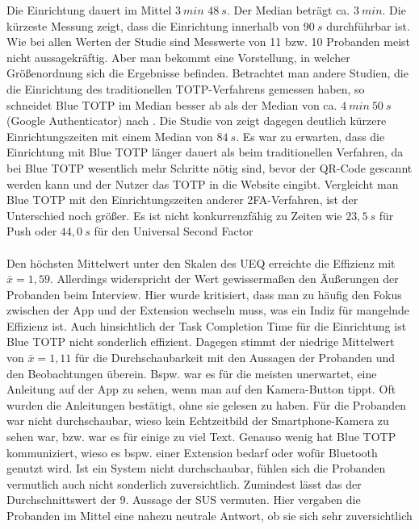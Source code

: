 Die Einrichtung dauert im Mittel $3~min$ $48~s$. Der Median 
beträgt ca. $3~min$. Die kürzeste Messung zeigt, dass die 
Einrichtung innerhalb von $90~s$ durchführbar ist. Wie bei allen 
Werten der Studie sind Messwerte von 11 bzw. 10 Probanden meist 
nicht aussagekräftig. Aber man bekommt eine Vorstellung, in 
welcher Größenordnung sich die Ergebnisse befinden. Betrachtet man 
andere Studien, die die Einrichtung des traditionellen 
TOTP-Verfahrens gemessen haben, so schneidet Blue TOTP im Median 
besser ab als der Median von ca. $4~min~50~s$ (Google 
Authenticator) nach \textcite{Acemyan}. Die Studie von 
\textcite{Reese} zeigt dagegen deutlich kürzere Einrichtungszeiten 
mit einem Median von $84~s$. Es war zu erwarten, dass die 
Einrichtung mit Blue TOTP länger dauert als beim traditionellen 
Verfahren, da bei Blue TOTP wesentlich mehr Schritte nötig sind, 
bevor der QR-Code gescannt werden kann und der Nutzer das TOTP in 
die Website eingibt. Vergleicht man Blue TOTP mit den Einrichtungszeiten anderer 
2FA-Verfahren, ist der Unterschied noch größer. Es ist nicht konkurrenzfähig 
zu Zeiten wie $23{,}5~s$ für Push oder $44{,}0~s$ für den Universal Second Factor \autocite{Reese}
\\\\
Den höchsten Mittelwert unter den Skalen des UEQ erreichte die 
Effizienz mit $\bar{x} = 1{,}59$. Allerdings widerspricht der Wert 
gewissermaßen den Äußerungen der Probanden beim Interview. Hier 
wurde kritisiert, dass man zu häufig den Fokus zwischen der App 
und der Extension wechseln muss, was ein Indiz für mangelnde 
Effizienz ist. Auch hinsichtlich der Task Completion Time für die 
Einrichtung ist Blue TOTP nicht sonderlich effizient. Dagegen 
stimmt der niedrige Mittelwert von $\bar{x} = 1{,}11$ für die 
Durchschaubarkeit mit den Aussagen der Probanden und den 
Beobachtungen überein. Bspw. war es für die meisten unerwartet, 
eine Anleitung auf der App zu sehen, wenn man auf den 
Kamera-Button tippt. Oft wurden die Anleitungen bestätigt, ohne 
sie gelesen zu haben. Für die Probanden war nicht durchschaubar, 
wieso kein Echtzeitbild der Smartphone-Kamera zu sehen war, bzw. 
war es für einige zu viel Text. Genauso wenig hat Blue TOTP 
kommuniziert, wieso es bspw. einer Extension bedarf oder wofür 
Bluetooth genutzt wird. Ist ein System nicht durchschaubar, fühlen 
sich die Probanden vermutlich auch nicht sonderlich 
zuversichtlich. Zumindest lässt das der Durchschnittswert der 9. 
Aussage der SUS vermuten. Hier vergaben die Probanden im Mittel 
eine nahezu neutrale Antwort, ob sie sich sehr zuversichtlich 
